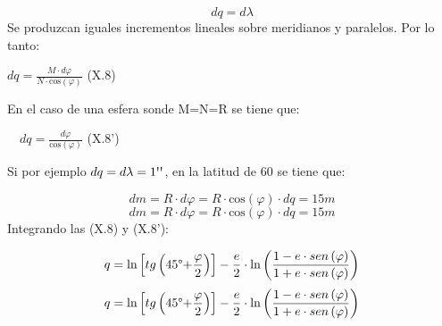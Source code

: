 \documentclass[]{article}
\begin{document}
\[{dq=d\lambda }\] Se produzcan iguales incrementos lineales sobre
meridianos y paralelos. Por lo tanto:

\({dq=\frac{M\cdot d\varphi }{N\cdot
\text{cos}\left(\varphi \right)}}\) (X.8)

En el caso de una esfera sonde M=N=R se tiene que:

~~\({dq=\frac{d\varphi
}{\text{cos}\left(\varphi \right)}}\) (X.8')

Si por ejemplo \({dq=d\lambda
=1\text{{\textquotesingle}{\textquotesingle}}}\), en la latitud de 60 se
tiene que:

\[{dm=R\cdot d\varphi =R\cdot
\text{cos}\left(\varphi \right)\cdot
dq=\text{15}m}\] \[{dm=R\cdot d\varphi =R\cdot
\text{cos}\left(\varphi \right)\cdot
dq=\text{15}m}\] Integrando las (X.8) y (X.8'):

\[{q=\text{ln}\left[tg\left(\text{45}\text{{\textdegree}+}\frac{\varphi
}{2}\right)\right]-\frac{e}{2}\cdot \text{ln}\left(\frac{1-e\cdot
sen\left(\varphi \right)}{1+e\cdot
sen\left(\varphi \right)}\right)}\]
\[{q=\text{ln}\left[tg\left(\text{45}\text{{\textdegree}+}\frac{\varphi
}{2}\right)\right]-\frac{e}{2}\cdot \text{ln}\left(\frac{1-e\cdot
sen\left(\varphi \right)}{1+e\cdot
sen\left(\varphi \right)}\right)}\]
\end{document}
